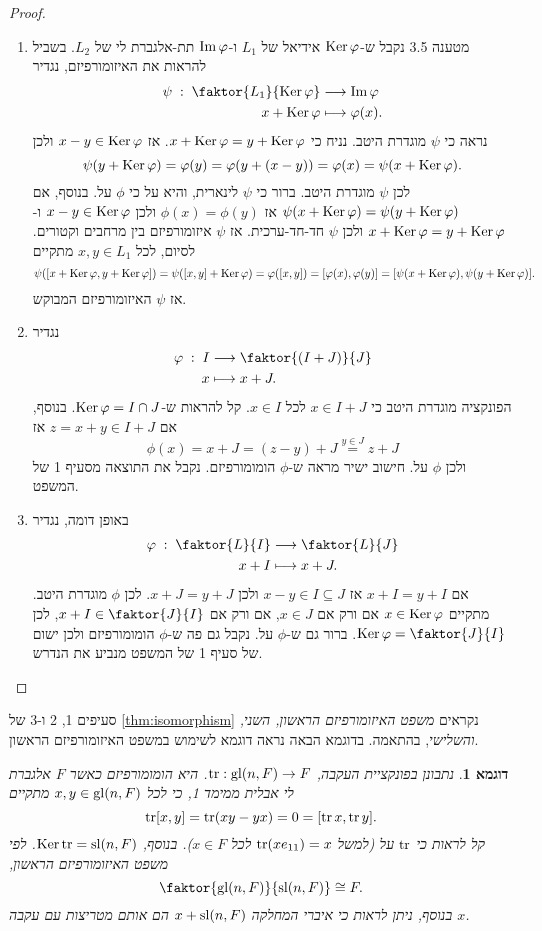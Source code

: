 \documentclass{report}
\theoremstyle{break}
\newtheorem{example}[example]{דוגמא}
\theoremstyle{MyNonumberbreak}
\newtheorem{proof}{הוכחה}
\begin{document}
\begin{proof}
\begin{enumerate}
	\item 
	מטענה 3.5 נקבל ש-$\operatorname{Ker}\varphi$ אידיאל של $L_1$ ו-$\operatorname{Im}\varphi$ תת-אלגברת לי של $L_2$. בשביל להראות את האיזומורפיזם, נגדיר
	\begin{align*}
		\psi \; : \; \faktor{L_1}{\Ker\phi} &\longrightarrow \Img\phi \\
		x + \Ker\phi &\longmapsto \phi(x).
	\end{align*}
	נראה כי $\psi$ מוגדרת היטב. נניח כי $x + \operatorname{Ker}\varphi = y + \operatorname{Ker}\varphi$. אז $x - y \in \operatorname{Ker}\varphi$ ולכן
\[ \psi(y + \operatorname{Ker}\varphi) = \varphi(y) = \varphi(y + (x - y)) = \varphi(x) = \psi(x + \operatorname{Ker}\varphi). \]
	לכן $\psi$ מוגדרת היטב. ברור כי $\psi$ לינארית, והיא על כי $\phi$ על. בנוסף, אם $\psi(x + \operatorname{Ker}\varphi) = \psi(y + \operatorname{Ker}\varphi)$ אז $\phi(x) = \phi(y)$ ולכן $x - y \in \operatorname{Ker}\varphi$ ו-$x + \operatorname{Ker}\varphi = y + \operatorname{Ker}\varphi$ ולכן $\psi$ חד-חד-ערכית. אז $\psi$ איזומורפיזם בין מרחבים וקטורים. לסיום, לכל $x, y \in L_1$ מתקיים
\[ \psi([x + \operatorname{Ker}\varphi, y + \operatorname{Ker}\varphi]) = \psi([x, y] + \operatorname{Ker}\varphi) = \varphi([x, y]) = [\varphi(x), \varphi(y)] = [\psi(x + \operatorname{Ker}\varphi), \psi(y + \operatorname{Ker}\varphi)]. \]
	אז $\psi$ האיזומורפיזם המבוקש.
	\item
	נגדיר
	\begin{align*}
		\phi \; : \; I &\longrightarrow \faktor{(I + J)}{J} \\
		x &\longmapsto x + J.
	\end{align*}
	הפונקציה מוגדרת היטב כי $x \in I + J$ לכל $x \in I$. קל להראות ש-$\operatorname{Ker}\varphi = I \cap J$. בנוסף, אם $z = x + y \in I + J$ אז
	\[ \phi(x) = x + J = (z - y) + J \overset{y \in J}{=} z + J \]
	ולכן $\phi$ על. חישוב ישיר מראה ש-$\phi$ הומומורפיזם. נקבל את התוצאה מסעיף 1 של המשפט.
	\item
	באופן דומה, נגדיר
	\begin{align*}
		\phi \; : \; \faktor{L}{I} &\longrightarrow \faktor{L}{J} \\
		x + I &\longmapsto x + J.
	\end{align*}
	אם $x + I = y + I$ אז $x - y \in I \subseteq J$ ולכן $x + J = y + J$. לכן $\phi$ מוגדרת היטב. מתקיים $x \in \operatorname{Ker}\varphi$ אם ורק אם $x \in J$, אם ורק אם $x + I \in \faktor{J}{I}$, לכן $\Ker\phi = \faktor{J}{I}$. ברור גם ש-$\phi$ על. נקבל גם פה ש-$\phi$ הומומורפיזם ולכן ישום של סעיף 1 של המשפט מנביע את הנדרש.
\end{enumerate}
\end{proof}
סעיפים 1, 2 ו-3 של \autoref*{thm:isomorphism} נקראים \textit{משפט האיזומורפיזם הראשון, השני, והשלישי}, בהתאמה. בדוגמא הבאה נראה דוגמא לשימוש במשפט האיזומורפיזם הראשון.
\begin{example}
	נתבונן בפונקציית העקבה, $\operatorname{tr} : \operatorname{gl}(n, F) \to F$. היא הומומורפיזם כאשר $F$ אלגברת לי אבלית ממימד 1, כי לכל $x, y \in \operatorname{gl}(n, F)$ מתקיים
	\[ \operatorname{tr}[x, y] = \operatorname{tr}(xy - yx) = 0 = [\operatorname{tr} x, \operatorname{tr} y]. \]
	קל לראות כי $\operatorname{tr}$ על (למשל $\operatorname{tr}(xe_{11}) = x$ לכל $x \in F$). בנוסף, $\operatorname{Ker}\operatorname{tr} = \operatorname{sl}(n, F)$. לפי משפט האיזומורפיזם הראשון,
	\[ \faktor{\gl(n, F)}{\Sl(n, F)} \cong F. \]
	בנוסף, ניתן לראות כי איברי המחלקה $x + \operatorname{sl}(n, F)$ הם אותם מטריצות עם עקבה $x$.
\end{example}
\end{document}
